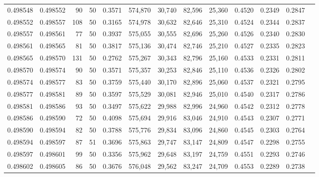\begin{tabular}{rrrrrrrrrrrrr}
0.498548 & 0.498552 &    90 &  50 &                                     0.3571 & 574,870 &  30,740 &  82,596 &  25,360 & 0.4520 & 0.2349 & 0.2847 \\
0.498552 & 0.498557 &   108 &  50 &                                     0.3165 & 574,978 &  30,632 &  82,646 &  25,310 & 0.4524 & 0.2344 & 0.2837 \\
0.498557 & 0.498561 &    77 &  50 &                                     0.3937 & 575,055 &  30,555 &  82,696 &  25,260 & 0.4526 & 0.2340 & 0.2830 \\
0.498561 & 0.498565 &    81 &  50 &                                     0.3817 & 575,136 &  30,474 &  82,746 &  25,210 & 0.4527 & 0.2335 & 0.2823 \\
0.498565 & 0.498570 &   131 &  50 &                                     0.2762 & 575,267 &  30,343 &  82,796 &  25,160 & 0.4533 & 0.2331 & 0.2811 \\
0.498570 & 0.498574 &    90 &  50 &                                     0.3571 & 575,357 &  30,253 &  82,846 &  25,110 & 0.4536 & 0.2326 & 0.2802 \\
0.498574 & 0.498577 &    83 &  50 &                                     0.3759 & 575,440 &  30,170 &  82,896 &  25,060 & 0.4537 & 0.2321 & 0.2795 \\
0.498577 & 0.498581 &    89 &  50 &                                     0.3597 & 575,529 &  30,081 &  82,946 &  25,010 & 0.4540 & 0.2317 & 0.2786 \\
0.498581 & 0.498586 &    93 &  50 &                                     0.3497 & 575,622 &  29,988 &  82,996 &  24,960 & 0.4542 & 0.2312 & 0.2778 \\
0.498586 & 0.498590 &    72 &  50 &                                     0.4098 & 575,694 &  29,916 &  83,046 &  24,910 & 0.4543 & 0.2307 & 0.2771 \\
0.498590 & 0.498594 &    82 &  50 &                                     0.3788 & 575,776 &  29,834 &  83,096 &  24,860 & 0.4545 & 0.2303 & 0.2764 \\
0.498594 & 0.498597 &    87 &  51 &                                     0.3696 & 575,863 &  29,747 &  83,147 &  24,809 & 0.4547 & 0.2298 & 0.2755 \\
0.498597 & 0.498601 &    99 &  50 &                                     0.3356 & 575,962 &  29,648 &  83,197 &  24,759 & 0.4551 & 0.2293 & 0.2746 \\
0.498602 & 0.498605 &    86 &  50 &                                     0.3676 & 576,048 &  29,562 &  83,247 &  24,709 & 0.4553 & 0.2289 & 0.2738 \\

\end{tabular}
